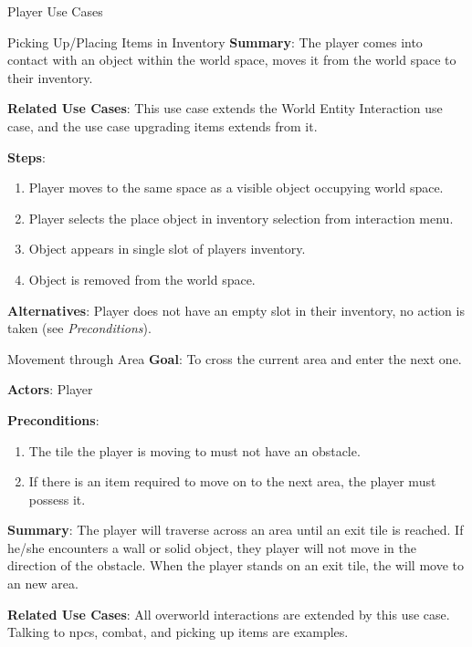 \documentclass[12pt]{report}
\begin{document}
\begin{section}{Player Use Cases}
\begin{subsection}{Picking Up/Placing Items in Inventory}
      \textbf{Summary}:
      The player comes into contact with an object within the world 
      space, moves it from the world space to their inventory.

      \textbf{Related Use Cases}:
      This use case extends the World Entity Interaction use case, and the
      use case upgrading items extends from it.

      \textbf{Steps}:
      \begin{enumerate}
        \item Player moves to the same space as a visible object occupying world
	      space.
        \item Player selects the place object in inventory selection from 
	      interaction menu.
        \item Object appears in single slot of players inventory.
        \item Object is removed from the world space.
      \end{enumerate}

      \textbf{Alternatives}:
      Player does not have an empty slot in their inventory, no action is
      taken (see \textit{Preconditions}).
    \end{subsection}


    \begin{subsection}{Movement through Area}
      \textbf{Goal}:
      To cross the current area and enter the next one.
      
      \textbf{Actors}:
      Player

      \textbf{Preconditions}:
      \begin{enumerate}
        \item The tile the player is moving to must not have an obstacle. 
        \item If there is an item required to move on to the next area, the player must possess it.
      \end{enumerate}

      \textbf{Summary}:
      The player will traverse across an area until an exit tile is reached. If he/she encounters a wall or solid object, they player will not move in the direction of the obstacle. When the player stands on an exit tile, the will move to an new area.

      \textbf{Related Use Cases}:
      All overworld interactions are extended by this use case. Talking to npcs, combat, and picking up items are examples.


\end{subsection}
\end{section}
\end{document}
